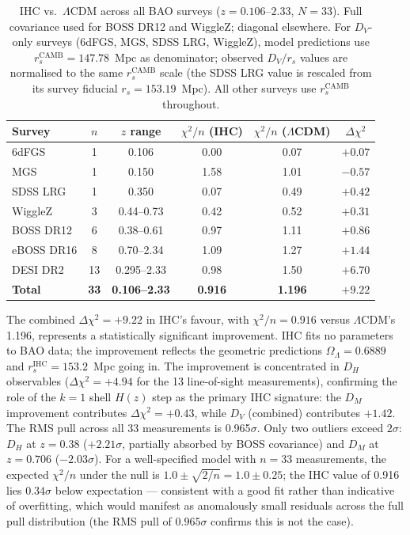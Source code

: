 \documentclass[12pt,a4paper]{article}
\begin{document}
\begin{table}[htbp]
\centering
\caption{IHC vs.\ $\Lambda$CDM across all BAO surveys ($z = 0.106$--$2.33$, $N = 33$).
Full covariance used for BOSS DR12 and WiggleZ; diagonal elsewhere.
For $D_V$-only surveys (6dFGS, MGS, SDSS LRG, WiggleZ), model predictions use
$r_s^\mathrm{CAMB} = 147.78$~Mpc as denominator; observed $D_V/r_s$ values are
normalised to the same $r_s^\mathrm{CAMB}$ scale (the SDSS LRG value is rescaled
from its survey fiducial $r_s = 153.19$~Mpc). All other surveys use
$r_s^\mathrm{CAMB}$ throughout.}
\label{tab:multisurvey}
\small
\begin{tabular}{lccccc}
\toprule
Survey & $n$ & $z$ range & $\chi^2/n$ (IHC) & $\chi^2/n$ ($\Lambda$CDM) & $\Delta\chi^2$ \\
\midrule
6dFGS   & 1 & 0.106 & 0.00 & 0.07 & $+0.07$ \\
MGS     & 1 & 0.150 & 1.58 & 1.01 & $-0.57$ \\
SDSS LRG& 1 & 0.350 & 0.07 & 0.49 & $+0.42$ \\
WiggleZ & 3 & 0.44--0.73 & 0.42 & 0.52 & $+0.31$ \\
BOSS DR12&6 & 0.38--0.61 & 0.97 & 1.11 & $+0.86$ \\
eBOSS DR16&8& 0.70--2.34 & 1.09 & 1.27 & $+1.44$ \\
DESI DR2&13 & 0.295--2.33 & 0.98 & 1.50 & $+6.70$ \\
\midrule
\textbf{Total} & \textbf{33} & \textbf{0.106--2.33} &
  \textbf{0.916} & \textbf{1.196} & $\mathbf{+9.22}$ \\
\bottomrule
\end{tabular}
\end{table}

The combined $\Delta\chi^2 = +9.22$ in IHC's favour, with $\chi^2/n = 0.916$ versus
$\Lambda$CDM's 1.196, represents a statistically significant improvement. IHC fits no
parameters to BAO data; the improvement reflects the geometric predictions
$\Omega_\Lambda = 0.6889$ and $r_s^\mathrm{IHC} = 153.2$~Mpc going in.
The improvement is concentrated in $D_H$ observables
($\Delta\chi^2 = +4.94$ for the 13 line-of-sight measurements), confirming the role
of the $k=1$ shell $H(z)$ step as the primary IHC signature: the $D_M$ improvement
contributes $\Delta\chi^2 = +0.43$, while $D_V$ (combined) contributes $+1.42$.
The RMS pull across all 33 measurements is 0.965$\sigma$. Only two outliers exceed
$2\sigma$: $D_H$ at $z = 0.38$ ($+2.21\sigma$, partially absorbed by BOSS covariance)
and $D_M$ at $z = 0.706$ ($-2.03\sigma$).
For a well-specified model with $n = 33$ measurements, the expected
$\chi^2/n$ under the null is $1.0 \pm \sqrt{2/n} = 1.0 \pm 0.25$; the IHC
value of 0.916 lies $0.34\sigma$ below expectation --- consistent with a
good fit rather than indicative of overfitting, which would manifest as
anomalously small residuals across the full pull distribution (the RMS
pull of $0.965\sigma$ confirms this is not the case).
\end{document}
